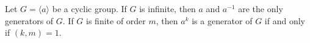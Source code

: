 \begin{theorem}
Let $G = \langle a \rangle$ be a cyclic group. If $G$ is infinite, then $a$ and $a^{-1}$ are the only generators of $G$. If $G$ is finite of order $m$, then $a^k$ is a generator of $G$ if and only if $(k,m) = 1$.
\end{theorem}
